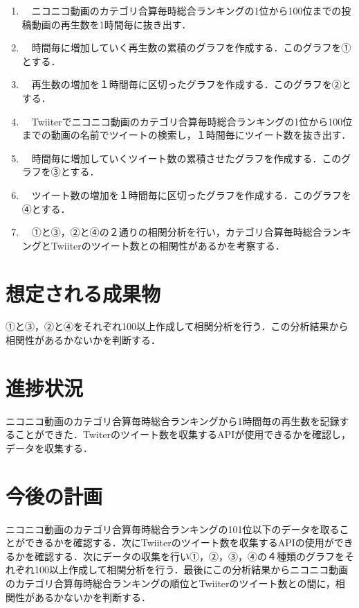 \documentclass[uplatex,twocolumn,dvipdfmx]{jsarticle}
\begin{document}
\begin{enumerate}

\item　ニコニコ動画のカテゴリ合算毎時総合ランキングの1位から100位までの投稿動画の再生数を1時間毎に抜き出す．
\item　時間毎に増加していく再生数の累積のグラフを作成する．このグラフを①とする．
\item　再生数の増加を１時間毎に区切ったグラフを作成する．このグラフを②とする．
\item　Twiiterでニコニコ動画のカテゴリ合算毎時総合ランキングの1位から100位までの動画の名前でツイートの検索し，１時間毎にツイート数を抜き出す．
\item　時間毎に増加していくツイート数の累積させたグラフを作成する．このグラフを③とする．
\item　ツイート数の増加を１時間毎に区切ったグラフを作成する．このグラフを④とする．
\item　①と③，②と④の２通りの相関分析を行い，カテゴリ合算毎時総合ランキングとTwiiterのツイート数との相関性があるかを考察する．

\end{enumerate}

\section{想定される成果物}
①と③，②と④をそれぞれ100以上作成して相関分析を行う．この分析結果から相関性があるかないかを判断する．

\section{進捗状況}
ニコニコ動画のカテゴリ合算毎時総合ランキングから1時間毎の再生数を記録することができた．Twiterのツイート数を収集するAPIが使用できるかを確認し，データを収集する．

\section{今後の計画}
ニコニコ動画のカテゴリ合算毎時総合ランキングの101位以下のデータを取ることができるかを確認する．次にTwiiterのツイート数を収集するAPIの使用ができるかを確認する．次にデータの収集を行い①，②，③，④の４種類のグラフをそれぞれ100以上作成して相関分析を行う．最後にこの分析結果からニコニコ動画のカテゴリ合算毎時総合ランキングの順位とTwiiterのツイート数との間に，相関性があるかないかを判断する．



\end{document}
